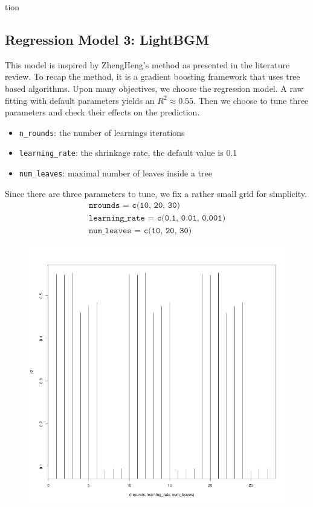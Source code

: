 tion\documentclass[8pt]{article}
\begin{document}
\begin{enumerate}
\subsection{Regression Model 3: LightBGM}
This model is inspired by ZhengHeng's method as presented in the literature review.
To recap the method, it is a gradient boosting framework that uses tree based algorithms. 
Upon many objectives, we choose the regression model. 
A raw fitting with default parameters yields an $R^2 \approx 0.55$. 
Then we choose to tune three parameters and check their effects on the prediction.
\begin{itemize}
    \item \texttt{n\_rounds}: the number of learnings iterations
    \item \texttt{learning\_rate}: the shrinkage rate, the default value is 0.1
    \item \texttt{num\_leaves}: maximal number of leaves inside a tree 
\end{itemize}
Since there are three parameters to tune, we fix a rather small grid for simplicity. 
\begin{align*}
    \texttt{nrounds = c(10, 20, 30)} \\
    \texttt{learning\_rate = c(0.1, 0.01, 0.001)} \\
    \texttt{num\_leaves = c(10, 20, 30)}
\end{align*}
\begin{figure}[H]
    \centering
    \includegraphics*[scale=0.25]{figures/rsquare_lightbgm.png}

\end{figure}
\end{enumerate}
\end{document}
